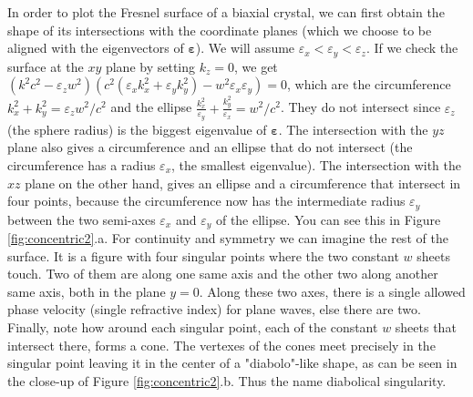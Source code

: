 \documentclass[11pt, a4paper, twoside]{article} %
\begin{document}
In order to plot the Fresnel surface of a biaxial crystal, we can first obtain the shape of its intersections with the coordinate planes (which we choose to be aligned with the eigenvectors of $\pmb{\varepsilon}$). We will assume $\varepsilon_x<\varepsilon_y<\varepsilon_z$. If we check the surface at the $xy$ plane by setting $k_z=0$, we get $(k^2c^2-\varepsilon_zw^2)(c^2(\varepsilon_xk_x^2+\varepsilon_yk_y^2)-w^2\varepsilon_x\varepsilon_y)=0$, which are the circumference $k_x^2+k_y^2=\varepsilon_zw^2/c^2$ and the ellipse $\frac{k_x^2}{\varepsilon_y}+\frac{k_y^2}{\varepsilon_x}=w^2/c^2$. They do not intersect since $\varepsilon_z$ (the sphere radius) is the biggest eigenvalue of $\pmb{\varepsilon}$. The intersection with the $yz$ plane also gives a circumference and an ellipse that do not intersect (the circumference has a radius $\varepsilon_x$, the smallest eigenvalue). The intersection with the $xz$ plane on the other hand, gives an ellipse and a circumference that intersect in four points, because the circumference now has the intermediate radius $\varepsilon_y$ between the two semi-axes $\varepsilon_x$ and $\varepsilon_y$ of the ellipse. You can see this in Figure \ref{fig:concentric2}.a. For continuity and symmetry we can imagine the rest of the surface. It is a figure with four singular points where the two constant $w$ sheets touch. Two of them are along one same axis and the other two along another same axis, both in the plane $y=0$. Along these two axes, there is a single allowed phase velocity (single refractive index) for plane waves, else there are two. Finally, note how around each singular point, each of the constant $w$ sheets that intersect there, forms a cone. The vertexes of the cones meet precisely in the singular point leaving it in the center of a "diabolo"-like shape, as can be seen in the close-up of Figure \ref{fig:concentric2}.b. Thus the name diabolical singularity.%
\end{document}
